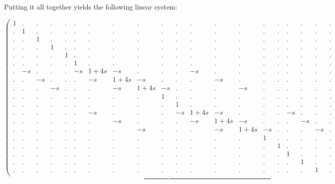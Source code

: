 Putting it all together yields the following linear system:

\begin{landscape}
\[
\underbrace{
\left(
\begin{array}{cccccccccccccccccccc}
1 & . & . & . & . & . & . & . & . & . & . & . & . & . & . & . & . & . & . & . \\ %
. & 1 & . & . & . & . & . & . & . & . & . & . & . & . & . & . & . & . & . & . \\ %
. & . & 1 & . & . & . & . & . & . & . & . & . & . & . & . & . & . & . & . & . \\ %
. & . & . & 1 & . & . & . & . & . & . & . & . & . & . & . & . & . & . & . & . \\ %
. & . & . & . & 1 & . & . & . & . & . & . & . & . & . & . & . & . & . & . & . \\ %
. & . & . & . & . & 1 & . & . & . & . & . & . & . & . & . & . & . & . & . & . \\ %
. & -s& . & . & . & -s& {1+4s} & -s& . & . & . & -s & . & . & . & . & . & . & . & . \\ %
. & . & -s& . & . & . & -s& {1+4s} & -s& . & . & . & -s & . & . & . & . & . & . & .\\ %
. & . & . & -s& . & . & . & -s & {1+4s} & -s & . & . & . & -s & . & . & . & . & . & . \\ %
. & . & . & . & . & . & . & . & . & 1 & . & . & . & . & . & . & . & . & . & . \\ %
. & . & . & . & . & . & . & . & . & . & 1 & . & . & . & . & . & . & . & . & . \\ %
. & . & . & . & . & . &-s & . & . & . & -s& {1+4s} & -s& . & . & .  & -s& . & . & .\\ %
. & . & . & . & . & . & . &-s & . & . & . & -s& {1+4s} & -s& . & . & .  & -s& . & .\\ %
. & . & . & . & . & . & . & . &-s & . & . & . & -s& {1+4s} & -s& . & . & .  & -s & .\\ %
. & . & . & . & . & . & . & . & . & . & . & . & . & . & 1 & . & . & . & . & . \\ %
. & . & . & . & . & . & . & . & . & . & . & . & . & . & . & 1 & . & . & . & . \\ %
. & . & . & . & . & . & . & . & . & . & . & . & . & . & . & . & 1 & . & . & . \\ %
. & . & . & . & . & . & . & . & . & . & . & . & . & . & . & . & . & 1 & . & . \\ %
. & . & . & . & . & . & . & . & . & . & . & . & . & . & . & . & . & . & 1 & . \\ %

\end{array}}\]
\end{landscape}
